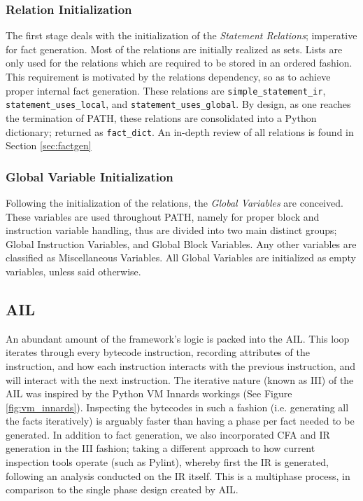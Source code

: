             \subsubsection*{Relation Initialization}
            \par The first stage deals with the initialization of the \textit{Statement Relations}; imperative for fact generation.
            Most of the relations are initially realized as sets. Lists are only used for the relations which are required to be stored in an ordered fashion. This requirement is motivated 
            by the relations dependency, so as to achieve proper internal fact generation. These relations are \lstinline{simple_statement_ir}, \lstinline{statement_uses_local}, and \lstinline{statement_uses_global}.
            By design, as one reaches the termination of \acs{PATH}, these relations are consolidated into a Python dictionary; returned as \lstinline{fact_dict}. An in-depth review of all relations is found in Section \ref{sec:factgen}

            \subsubsection*{Global Variable Initialization}
            \par Following the initialization of the relations, the \textit{Global Variables} are conceived. These variables are used throughout \acs{PATH}, namely for proper block and instruction variable handling, thus
            are divided into two main distinct groups; Global Instruction Variables, and Global Block Variables. Any other variables are classified as Miscellaneous Variables. All Global Variables are initialized as empty variables, unless said otherwise.

        \subsection{\acs{AIL}}
        \label{subsec:AILimp}
        \par An abundant amount of the framework's logic is packed into the \acs{AIL}. This loop iterates through every bytecode instruction, recording attributes of the instruction, and how 
        each instruction interacts with the previous instruction, and will interact with the next instruction. The iterative nature (known as \acs{III}) of the \acs{AIL} was inspired by the Python VM Innards workings (See Figure \ref{fig:vm_innards}). Inspecting the bytecodes in such a fashion (i.e. generating all the facts iteratively) is arguably faster than having 
        a phase per fact needed to be generated. In addition to fact generation, we also incorporated \acs{CFA} and \acs{IR} generation in the \acs{III} fashion; taking a different approach to how current inspection tools operate (such as Pylint), whereby first the \acs{IR} is generated, following an analysis conducted on the \acs{IR} itself. This is a multiphase process, in comparison to the single phase 
        design created by \acs{AIL}.
